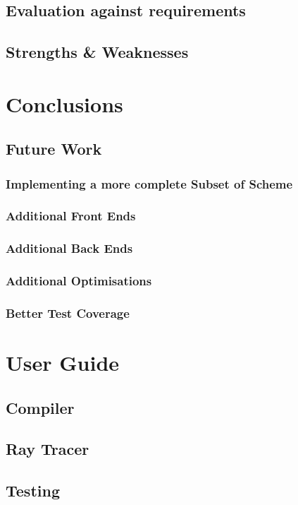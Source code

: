 \documentclass[11pt]{report}
\begin{document}
\section{Evaluation against requirements}
\section{Strengths \& Weaknesses}

\chapter{Conclusions}
\section{Future Work}
\subsection{Implementing a more complete Subset of Scheme}
\subsection{Additional Front Ends}
\subsection{Additional Back Ends}
\subsection{Additional Optimisations}
\subsection{Better Test Coverage}

\chapter{User Guide}
\section{Compiler}
\section{Ray Tracer}
\section{Testing}
\end{document}
